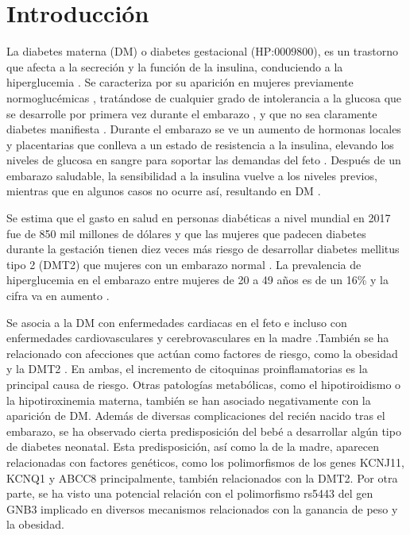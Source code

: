 \section{Introducción}

La diabetes materna (DM) o diabetes gestacional (HP:0009800), es un trastorno que afecta a la secreción y la función de la insulina, conduciendo a la hiperglucemia \cite{Rodolaki2023}. Se caracteriza por su aparición en mujeres previamente normoglucémicas \cite{Rodolaki2023}, tratándose de cualquier grado de intolerancia a la glucosa que se desarrolle por primera vez durante el embarazo \cite{ADB2009}, y que no sea claramente diabetes manifiesta \cite{Grazia2020}. Durante el embarazo se ve un aumento de hormonas locales y placentarias que conlleva a un estado de resistencia a la insulina, elevando los niveles de glucosa en sangre para soportar las demandas del feto \cite{Plows2018}. Después de un embarazo saludable, la sensibilidad a la insulina vuelve a los niveles previos, mientras que en algunos casos no ocurre así, resultando en DM \cite{Plows2018}.


Se estima que el gasto en salud en personas diabéticas a nivel mundial en 2017 fue de 850 mil millones de dólares \cite{Cho2018} y que las mujeres que padecen diabetes durante la gestación tienen diez veces más riesgo de desarrollar diabetes mellitus tipo 2 (DMT2) que mujeres con un embarazo normal \cite{Vounzoulaki2020} \cite{You2021}. La prevalencia de hiperglucemia en el embarazo entre mujeres de 20 a 49 años es de un 16\% y la cifra va en aumento \cite{Guariguata2014}.

Se asocia a la DM con enfermedades cardiacas en el feto \cite{Depla2021} e incluso con enfermedades cardiovasculares y cerebrovasculares en la madre \cite{Xie2022}.También se ha relacionado con afecciones que actúan como factores de riesgo, como la obesidad\cite{Shah2011} y la DMT2 \cite{Haroush2004}. En ambas, el incremento de citoquinas proinflamatorias es la principal causa de riesgo\cite{Pantham2015}. Otras patologías metabólicas, como el hipotiroidismo\cite{Gong2016} o la hipotiroxinemia materna\cite{Topaloglu2022}, también se han asociado negativamente con la aparición de DM.
Además de diversas complicaciones del recién nacido tras el embarazo\cite{Depla2021}\cite{Metzger2010}, se ha observado cierta predisposición del bebé a desarrollar algún tipo de diabetes neonatal\cite{Dabelea2000}. Esta predisposición, así como la de la madre, aparecen relacionadas con factores genéticos, como los polimorfismos de los genes KCNJ11, KCNQ1\cite{Ao2015} y ABCC8 \cite{Piccini2018} principalmente, también relacionados con la DMT2\cite{Khan2020}.
Por otra parte, se ha visto una potencial relación con el polimorfismo rs5443 
del gen GNB3\cite{Feng2019} implicado en diversos mecanismos relacionados con la ganancia de peso y la obesidad\cite{Hsiao2013}. 


